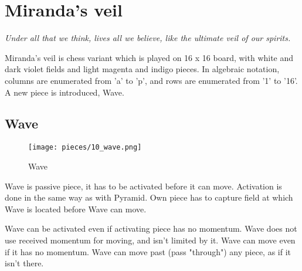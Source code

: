 

\chapter*{Miranda's veil}
\label{ch:Miranda's veil}

\begin{flushright}
\parbox{0.8\textwidth}{
\emph{Under all that we think, lives all we believe, like the ultimate veil of our spirits. \\
 } }
\end{flushright}

\noindent
Miranda's veil is chess variant which is played on 16 x 16 board, with
white and dark violet fields and light magenta and indigo pieces. In
algebraic notation, columns are enumerated from 'a' to 'p', and rows
are enumerated from '1' to '16'. A new piece is introduced, Wave.

\clearpage %

\section*{Wave}
\label{sec:Miranda's veil/Wave}

\vspace*{-1.4\baselineskip}
\noindent
\begin{wrapfigure}[12]{l}{0.4\textwidth}
\centering
\texttt{[image: pieces/10\_wave.png]}
\caption{Wave}
\label{fig:10_wave}
\end{wrapfigure}
Wave is passive piece, it has to be activated before it can move. Activation
is done in the same way as with Pyramid. Own piece has to capture field at
which Wave is located before Wave can move.

Wave can be activated even if activating piece has no momentum. Wave does not use
received momentum for moving, and isn't limited by it. Wave can move even if it
has no momentum. Wave can move past (pass "through") any piece, as if it isn't there.

